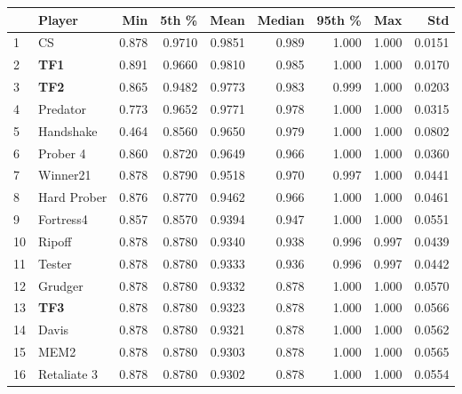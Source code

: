 \begin{tabular}{llrrrrrrr}
\toprule
{} &       Player &    Min &   5th \% &    Mean &  Median &  95th \% &    Max &     Std \\
\midrule
1  &           CS &  0.878 &  0.9710 &  0.9851 &   0.989 &   1.000 &  1.000 &  0.0151 \\
2  &          \textbf{TF1} &  0.891 &  0.9660 &  0.9810 &   0.985 &   1.000 &  1.000 &  0.0170 \\
3  &          \textbf{TF2} &  0.865 &  0.9482 &  0.9773 &   0.983 &   0.999 &  1.000 &  0.0203 \\
4  &     Predator &  0.773 &  0.9652 &  0.9771 &   0.978 &   1.000 &  1.000 &  0.0315 \\
5  &    Handshake &  0.464 &  0.8560 &  0.9650 &   0.979 &   1.000 &  1.000 &  0.0802 \\
6  &     Prober 4 &  0.860 &  0.8720 &  0.9649 &   0.966 &   1.000 &  1.000 &  0.0360 \\
7  &     Winner21 &  0.878 &  0.8790 &  0.9518 &   0.970 &   0.997 &  1.000 &  0.0441 \\
8  &  Hard Prober &  0.876 &  0.8770 &  0.9462 &   0.966 &   1.000 &  1.000 &  0.0461 \\
9  &    Fortress4 &  0.857 &  0.8570 &  0.9394 &   0.947 &   1.000 &  1.000 &  0.0551 \\
10 &       Ripoff &  0.878 &  0.8780 &  0.9340 &   0.938 &   0.996 &  0.997 &  0.0439 \\
11 &       Tester &  0.878 &  0.8780 &  0.9333 &   0.936 &   0.996 &  0.997 &  0.0442 \\
12 &      Grudger &  0.878 &  0.8780 &  0.9332 &   0.878 &   1.000 &  1.000 &  0.0570 \\
13 &          \textbf{TF3} &  0.878 &  0.8780 &  0.9323 &   0.878 &   1.000 &  1.000 &  0.0566 \\
14 &        Davis &  0.878 &  0.8780 &  0.9321 &   0.878 &   1.000 &  1.000 &  0.0562 \\
15 &         MEM2 &  0.878 &  0.8780 &  0.9303 &   0.878 &   1.000 &  1.000 &  0.0565 \\
16 &  Retaliate 3 &  0.878 &  0.8780 &  0.9302 &   0.878 &   1.000 &  1.000 &  0.0554 \\
\bottomrule
\end{tabular}
